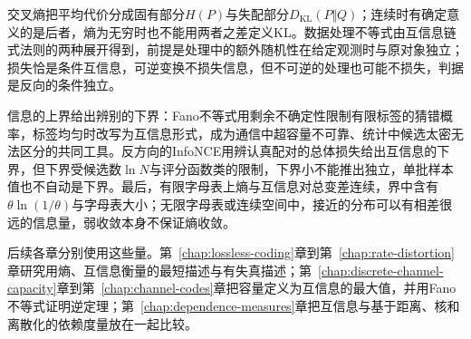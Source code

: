 交叉熵把平均代价分成固有部分$H(P)$与失配部分$D_{\mathrm{KL}}(P\Vert Q)$；连续时有确定意义的是后者，熵为无穷时也不能用两者之差定义KL。数据处理不等式由互信息链式法则的两种展开得到，前提是处理中的额外随机性在给定观测时与原对象独立；损失恰是条件互信息，可逆变换不损失信息，但不可逆的处理也可能不损失，判据是反向的条件独立。

信息的上界给出辨别的下界：Fano不等式用剩余不确定性限制有限标签的猜错概率，标签均匀时改写为互信息形式，成为通信中超容量不可靠、统计中候选太密无法区分的共同工具。反方向的InfoNCE用辨认真配对的总体损失给出互信息的下界，但下界受候选数$\ln N$与评分函数类的限制，下界小不能推出独立，单批样本值也不自动是下界。最后，有限字母表上熵与互信息对总变差连续，界中含有$\theta\ln(1/\theta)$与字母表大小；无限字母表或连续空间中，接近的分布可以有相差很远的信息量，弱收敛本身不保证熵收敛。

后续各章分别使用这些量。第~\ref{chap:lossless-coding}章到第~\ref{chap:rate-distortion}章研究用熵、互信息衡量的最短描述与有失真描述；第~\ref{chap:discrete-channel-capacity}章到第~\ref{chap:channel-codes}章把容量定义为互信息的最大值，并用Fano不等式证明逆定理；第~\ref{chap:dependence-measures}章把互信息与基于距离、核和离散化的依赖度量放在一起比较。
